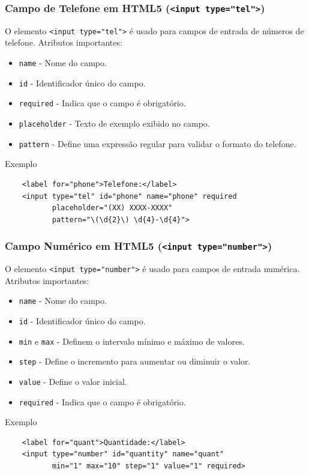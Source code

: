 \documentclass{beamer}
\begin{document}
\begin{frame}[fragile]
  \frametitle{Campo de Telefone em HTML5 (\texttt{<input type="tel"}\texttt{>})}

  O elemento \texttt{<input type="tel"\texttt{>}} é usado para campos de entrada de números de telefone. Atributos importantes:
  \begin{itemize}
    \item \texttt{name} - Nome do campo.
    \item \texttt{id} - Identificador único do campo.
    \item \texttt{required} - Indica que o campo é obrigatório.
    \item \texttt{placeholder} - Texto de exemplo exibido no campo.
    \item \texttt{pattern} - Define uma expressão regular para validar o formato do telefone.
  \end{itemize}

  \begin{block}{Exemplo}
    \begin{verbatim}
    <label for="phone">Telefone:</label>
    <input type="tel" id="phone" name="phone" required
           placeholder="(XX) XXXX-XXXX"
           pattern="\(\d{2}\) \d{4}-\d{4}">
    \end{verbatim}
  \end{block}
\end{frame}



\begin{frame}[fragile]
  \frametitle{Campo Numérico em HTML5 (\texttt{<input type="number"}\texttt{>})}

  O elemento \texttt{<input type="number"}\texttt{>} é usado para campos de entrada numérica.  Atributos importantes:

  \begin{itemize}
    \item \texttt{name} - Nome do campo.
    \item \texttt{id} - Identificador único do campo.
    \item \texttt{min} e \texttt{max} - Definem o intervalo mínimo e máximo de valores.
    \item \texttt{step} - Define o incremento para aumentar ou diminuir o valor.
    \item \texttt{value} - Define o valor inicial.
    \item \texttt{required} - Indica que o campo é obrigatório.
  \end{itemize}

  \begin{block}{Exemplo}
    \begin{verbatim}
    <label for="quant">Quantidade:</label>
    <input type="number" id="quantity" name="quant"
           min="1" max="10" step="1" value="1" required>
    \end{verbatim}
  \end{block}
\end{frame}
\end{document}
